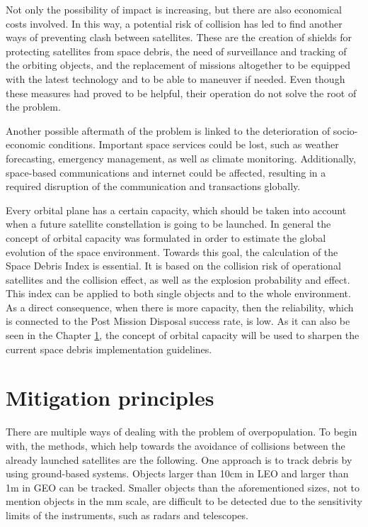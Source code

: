 Not only the possibility of impact is increasing, but there are also economical costs involved. In this way, a potential risk of collision has led to find another ways of preventing clash between satellites. These are the creation of shields for protecting satellites from space debris, the need of surveillance and tracking of the orbiting objects, and the replacement of missions altogether to be equipped with the latest technology and to be able to maneuver if needed. Even though these measures had proved to be helpful, their operation do not solve the root of the problem.

Another possible aftermath of the problem is linked to the deterioration of socio-economic conditions. Important space services could be lost, such as weather forecasting, emergency management, as well as climate monitoring. Additionally, space-based communications and internet could be affected, resulting in a required disruption of the communication and transactions globally. \cite{Undseth}

\bigskip

Every orbital plane has a certain capacity, which should be taken into account when a future satellite constellation is going to be launched. In general the concept of orbital capacity was formulated in order to estimate the global evolution of the space environment. Towards this goal, the calculation of the Space Debris Index is essential. It is based on the collision risk of operational satellites and the collision effect, as well as the explosion probability and effect. This index can be applied to both single objects and to the whole environment. As a direct consequence, when there is more capacity, then the reliability, which is connected to the Post Mission Disposal success rate, is low. As it can also be seen in the Chapter \ref{chap:mitigation}, the concept of orbital capacity will be used to sharpen the current space debris implementation guidelines. \cite{Letizia 2019}


\bigskip
\section{Mitigation principles}
\label{chap:mitigation}
\bigskip

There are multiple ways of dealing with the problem of overpopulation. %
To begin with, the methods, which help towards the avoidance of collisions between the already launched satellites are the following. One approach is to track debris by using ground-based systems. Objects larger than 10cm in LEO and larger than 1m in GEO can be tracked. \cite{Kramer 2002} Smaller objects than the aforementioned sizes, not to mention objects in the mm scale, are difficult to be detected due to the sensitivity limits of the instruments, such as radars and telescopes.

